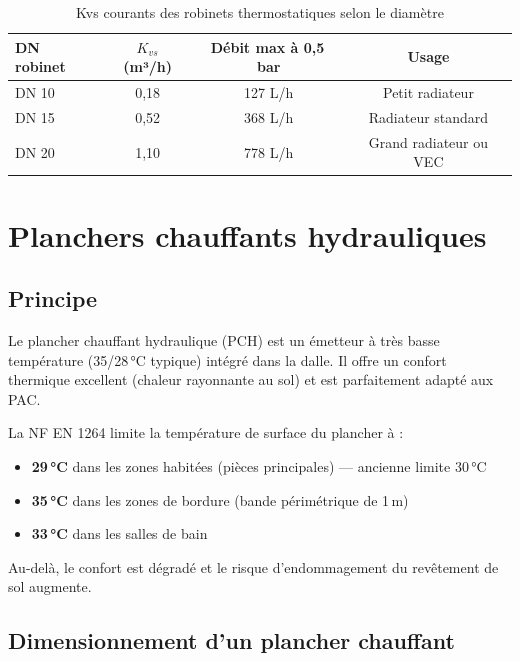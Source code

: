 \begin{table}[H]
  \centering
  \caption{Kvs courants des robinets thermostatiques selon le diamètre}
  \begin{tabular}{lccc}
    \toprule
    DN robinet & $K_{vs}$ (m³/h) & Débit max à 0,5\,bar & Usage \\
    \midrule
    DN 10 & 0,18 & 127 L/h & Petit radiateur \\
    DN 15 & 0,52 & 368 L/h & Radiateur standard \\
    DN 20 & 1,10 & 778 L/h & Grand radiateur ou VEC \\
    \bottomrule
  \end{tabular}
\end{table}

\section{Planchers chauffants hydrauliques}

\subsection{Principe}

Le plancher chauffant hydraulique (PCH) est un émetteur à très basse température (35/28\,°C typique) intégré dans la dalle. Il offre un confort thermique excellent (chaleur rayonnante au sol) et est parfaitement adapté aux PAC.

\begin{definition}[title=Température de surface maximale réglementaire (NF EN 1264)]
La NF EN 1264 limite la température de surface du plancher à :
\begin{itemize}
  \item \textbf{29\,°C} dans les zones habitées (pièces principales) — ancienne limite 30\,°C
  \item \textbf{35\,°C} dans les zones de bordure (bande périmétrique de 1\,m)
  \item \textbf{33\,°C} dans les salles de bain
\end{itemize}
Au-delà, le confort est dégradé et le risque d'endommagement du revêtement de sol augmente.
\end{definition}

\subsection{Dimensionnement d'un plancher chauffant}

